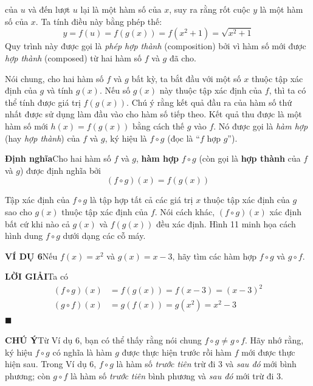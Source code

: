 \begin{minipage}[t]{0.708\textwidth}
    \fontsize{9.3pt}{13.2pt}\selectfont
    của $u$ và đến lượt $u$ lại là một hàm số của $x$, suy ra rằng rốt cuộc $y$ là một hàm số của $x$. Ta tính điều này bằng phép thế:
    \[
    y = f(u) = f(g(x)) = f(x^2 + 1) = \sqrt{x^2 + 1}
    \]
    Quy trình này được gọi là \textit{phép hợp thành} (composition) bởi vì hàm số mới được \textit{hợp thành} (composed) từ hai hàm số $f$ và $g$ đã cho.

    Nói chung, cho hai hàm số $f$ và $g$ bất kỳ, ta bắt đầu với một số $x$ thuộc tập xác định của $g$ và tính $g(x)$. Nếu số $g(x)$ này thuộc tập xác định của $f$, thì ta có thể tính được giá trị $f(g(x))$. Chú ý rằng kết quả đầu ra của hàm số thứ nhất được sử dụng làm đầu vào cho hàm số tiếp theo. Kết quả thu được là một hàm số mới $h(x) = f(g(x))$ bằng cách thế $g$ vào $f$. Nó được gọi là \textit{hàm hợp} (hay \textit{hợp thành}) của $f$ và $g$, ký hiệu là $f \circ g$ (đọc là ``$f$ hợp $g$'').

    \begin{definitionbox}
        \textbf{\textcolor{stewartred}{Định nghĩa}}\quad Cho hai hàm số $f$ và $g$, \textbf{hàm hợp} $f \circ g$ (còn gọi là \textbf{hợp thành} của $f$ và $g$) được định nghĩa bởi
        \[
        (f \circ g)(x) = f(g(x))
        \]
    \end{definitionbox}

    Tập xác định của $f \circ g$ là tập hợp tất cả các giá trị $x$ thuộc tập xác định của $g$ sao cho $g(x)$ thuộc tập xác định của $f$. Nói cách khác, $(f \circ g)(x)$ xác định bất cứ khi nào cả $g(x)$ và $f(g(x))$ đều xác định. Hình 11 minh họa cách hình dung $f \circ g$ dưới dạng các cỗ máy.

    \vspace{4pt}
    \noindent\textbf{\textsf{\color{stewartcyan}VÍ DỤ 6}}\quad Nếu $f(x) = x^2$ và $g(x) = x - 3$, hãy tìm các hàm hợp $f \circ g$ và $g \circ f$.

    \vspace{2pt}
    \noindent\textbf{\textsf{\color{stewartcyan}LỜI GIẢI}}\quad Ta có
    \begin{align*}
        (f \circ g)(x) &= f(g(x)) = f(x - 3) = (x - 3)^2\\[3pt]
        (g \circ f)(x) &= g(f(x)) = g(x^2) = x^2 - 3
    \end{align*}
    \hfill{\color{stewartcyan}$\blacksquare$}

    \vspace{2pt}
    \noindent{}\;\textbf{\textsf{\color{stewartgreen}CHÚ Ý}}\quad Từ Ví dụ 6, bạn có thể thấy rằng nói chung $f \circ g \ne g \circ f$. Hãy nhớ rằng, \textcolor{stewartred}{ký hiệu $f \circ g$ có nghĩa là hàm $g$ được thực hiện trước rồi hàm $f$ mới được thực hiện sau.} Trong Ví dụ 6, $f \circ g$ là hàm số \textit{trước tiên} trừ đi 3 và \textit{sau đó} mới bình phương; còn $g \circ f$ là hàm số \textit{trước tiên} bình phương và \textit{sau đó} mới trừ đi 3.


\end{minipage}
